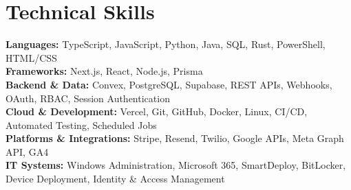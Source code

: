 \documentclass[letterpaper,11pt]{article}
\begin{document}
\vspace{-4pt}
\section{Technical Skills}
\vspace{2pt}
\small{
\textbf{Languages:} TypeScript, JavaScript, Python, Java, SQL, Rust, PowerShell, HTML/CSS \\
\textbf{Frameworks:} Next.js, React, Node.js, Prisma \\
\textbf{Backend \& Data:} Convex, PostgreSQL, Supabase, REST APIs, Webhooks, OAuth, RBAC, Session Authentication \\
\textbf{Cloud \& Development:} Vercel, Git, GitHub, Docker, Linux, CI/CD, Automated Testing, Scheduled Jobs \\
\textbf{Platforms \& Integrations:} Stripe, Resend, Twilio, Google APIs, Meta Graph API, GA4 \\
\textbf{IT Systems:} Windows Administration, Microsoft 365, SmartDeploy, BitLocker, Device Deployment, Identity \& Access Management
}
\end{document}
